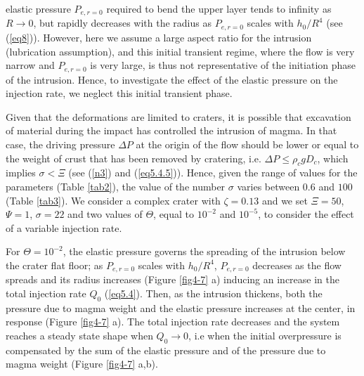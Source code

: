 \begin{article}
        elastic pressure $P_{e,r=0}$ required  to bend the upper layer
        tends to  infinity as $R\rightarrow 0$,  but rapidly decreases
        with  the radius  as  $P_{e,r=0}$ scales  with $h_0/R^4$  (see
        (\ref{eq8})). However, here we assume a large aspect ratio for
        the  intrusion  (lubrication  assumption),  and  this  initial
        transient  regime,   where  the   flow  is  very   narrow  and
        $P_{e,r=0}$ is very  large, is thus not  representative of the
        initiation phase  of the intrusion. Hence,  to investigate the
        effect  of the  elastic  pressure on  the  injection rate,  we
        neglect this initial transient phase.
 
        Given  that the  deformations are  limited to  craters, it  is
        possible  that excavation  of material  during the  impact has
        controlled the intrusion  of magma. In that  case, the driving
        pressure $\Delta P$ at the origin  of the flow should be lower
        or  equal to  the weight  of crust  that has  been removed  by
        cratering,  i.e.  $\Delta  P\le \rho_c  gD_c$,  which  implies
        $\sigma<\Xi$  (see  (\ref{n3})  and  (\ref{eq5.4.5})).  Hence,
        given  the   range  of   values  for  the   parameters  (Table
        \ref{tab2}), the  value of the number  $\sigma$ varies between
        $0.6$  and $100$  (Table  \ref{tab3}). We  consider a  complex
        crater  with  $\zeta=0.13$  and  we  set  $\Xi=50$,  $\Psi=1$,
        $\sigma=22$ and two values of $\Theta$, equal to $10^{-2}$ and
        $10^{-5}$,  to consider  the  effect of  a variable  injection
        rate.

        For  $\Theta=10^{-2}$,   the  elastic  pressure   governs  the
        spreading of  the intrusion  below the  crater flat  floor; as
        $P_{e,r=0}$  scales with  $h_0/R^4$, $P_{e,r=0}$  decreases as
        the flow spreads and its radius increases (Figure \ref{fig4-7}
        a) inducing  an increase in  the total injection  rate $Q_{0}$
        (\ref{eq5.4}).  Then,  as  the intrusion  thickens,  both  the
        pressure  due  to  magma   weight  and  the  elastic  pressure
        increases  at the  center,  in  response (Figure  \ref{fig4-7}
        a). The total injection rate  decreases and the system reaches
        a steady  state shape  when $Q_{0}\rightarrow0$, i.e  when the
        initial overpressure is compensated by  the sum of the elastic
        pressure  and of  the  pressure due  to  magma weight  (Figure
        \ref{fig4-7} a,b).


\end{article}
